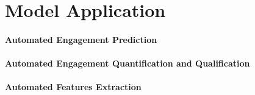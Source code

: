 \section{Model Application}
\label{industry_needs}

\paragraph*{Automated Engagement Prediction}
\lorem

\paragraph*{Automated Engagement Quantification and Qualification}
\lorem

\paragraph*{Automated Features Extraction}
\lorem